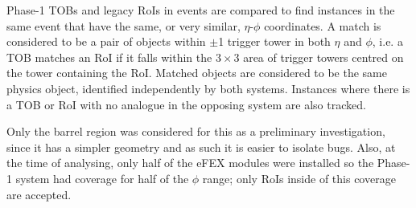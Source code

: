 
Phase-1 \ac{TOB}s and legacy \ac{RoI}s in events are compared to find instances
in the same event that have the same, or very similar, $\eta$-$\phi$
coordinates. A match is considered to be a pair of objects within $\pm$1 trigger
tower in both $\eta$ and $\phi$, i.e. a \ac{TOB} matches an \ac{RoI} if it falls
within the $3\times3$ area of trigger towers centred on the tower containing the
\ac{RoI}. Matched objects are considered to be the same physics object,
identified independently by both systems. 
%
Instances where there is a \ac{TOB} or \ac{RoI} with no analogue in the opposing
system are also tracked.
%

Only the barrel region was considered for this as a preliminary investigation,
since it has a simpler geometry and as such it is easier to isolate bugs. Also,
at the time of analysing, only half of the eFEX modules were installed so the
Phase-1 system had coverage for half of the $\phi$ range; only \ac{RoI}s inside
of this coverage are accepted.
